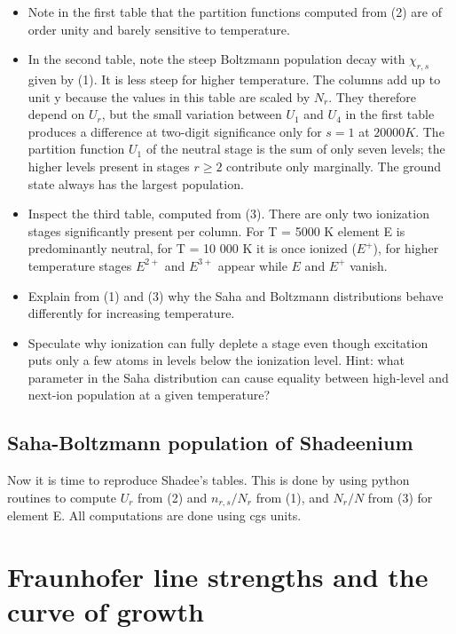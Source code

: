 \documentclass{aa}   %
\begin{document}
\begin{itemize}
 \item 
 Note in the first table that the partition functions computed from (2) are of order unity and barely sensitive to temperature.
\item
In the second table, note the steep Boltzmann population decay with $\chi_{r,s}$ given by (1). It is less steep for higher temperature. The columns add up to unit y because the values in this table are scaled by $N_r$. They therefore depend on $U_r$, but the small variation between $U_1$ and $U_4$ in the first table produces a difference at two-digit significance only for $s = 1$ at $20 000 K$. The partition function $U_1$ of the neutral stage is the sum of only seven levels; the higher levels present in stages $r \ge 2$ contribute only marginally. The ground state always has the largest population.
\item
Inspect the third table, computed from (3). There are only two ionization stages significantly present per column. For T = 5000 K element E is predominantly neutral, for T = 10 000 K it is once ionized ($E^+$), for higher temperature stages $E^{2+}$ and $E^{3+}$ appear while $E$ and $E^+$ vanish.
\item
Explain from (1) and (3) why the Saha and Boltzmann distributions behave differently for increasing temperature.
\item
Speculate why ionization can fully deplete a stage even though excitation puts only a few atoms in levels below the ionization level. Hint: what parameter in the Saha distribution can cause equality between high-level and next-ion population at a given temperature?
\end{itemize}
\subsection{Saha-Boltzmann population of Shadeenium}
Now it is time to reproduce Shadee's tables. This is done by using python routines to compute $U_r$ from (2) and $n_{r,s}/N_r$ from (1), and $N_r/N$ from (3) for element E. All computations are done using cgs units.
\section{Fraunhofer line strengths and the curve of growth}   \label{sec:Fraunhofer}
\end{document}
